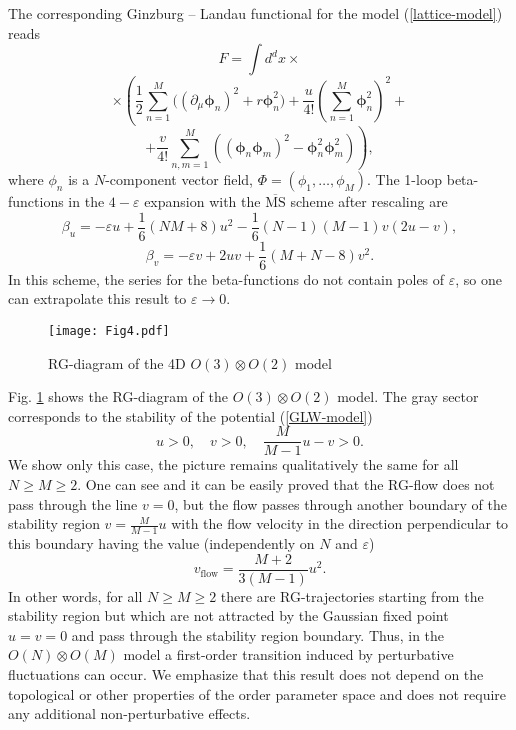\documentclass[final,twocolumn]{elsarticle}
\begin{document}
The corresponding Ginzburg -- Landau functional for the model (\ref{lattice-model}) reads \cite{Kawamura90}
$$
    F=\int d^dx\times
$$
$$
    \times\left(\frac12\sum_{n=1}^{M}\bigl((\partial_\mu\mathbf{\phi}_n)^2+r\mathbf{\phi}_n^2\bigr)+
    \frac u{4!}\left(\sum_{n=1}^M\mathbf{\phi}_n^2\right)^2+\right.
$$
\begin{equation}
    \left.
    +\frac v{4!}\sum_{n,m=1}^M\left((\mathbf{\phi}_n\mathbf{\phi}_m)^2-\mathbf{\phi}_n^2\mathbf{\phi}_m^2\right)\right),
    \label{GLW-model}
\end{equation}
where $\phi_n$ is a $N$-component vector field, $\Phi=(\phi_1,\ldots,\phi_M)$. The 1-loop beta-functions in the $4-\varepsilon$ expansion with the $\overline{\mathrm{MS}}$ scheme after rescaling are
\begin{equation}
    \beta_u=-\varepsilon u+\frac16(NM+8)u^2-\frac16(N-1)(M-1)v(2u-v),
\end{equation}
\begin{equation}
    \beta_v=-\varepsilon v+2uv+\frac16(M+N-8)v^2.
\end{equation}
In this scheme, the series for the beta-functions do not contain poles of $\varepsilon$, so one can extrapolate this result to $\varepsilon\to0$.

\begin{figure}[t]
    \center
    \texttt{[image: Fig4.pdf]}%
    \caption{\label{fig4} RG-diagram of the 4D $O(3)\otimes O(2)$ model}
\end{figure}%
Fig. \ref{fig4} shows the RG-diagram of the $O(3)\otimes O(2)$ model. The gray sector corresponds to the stability of the potential (\ref{GLW-model})
\begin{equation}
    u>0,\quad v>0,\quad \frac{M}{M-1}u-v>0.
\end{equation}
We show only this case, the picture remains qualitatively the same for all $N\geq M\geq2$. One can see and it can be easily proved that the RG-flow does not pass through the line $v=0$, but the flow passes through another boundary of the stability region $v=\frac{M}{M-1}u$ with the flow velocity in the direction perpendicular to this boundary having the value (independently on $N$ and $\varepsilon$)
\begin{equation}
    v_{\mathrm{flow}}=\frac{M+2}{3(M-1)}u^2.
\end{equation}
In other words, for all $N\geq M\geq2$ there are RG-trajectories starting from the stability region but which are not attracted by the Gaussian fixed point $u=v=0$ and pass through the stability region boundary. Thus, in the $O(N)\otimes O(M)$ model a first-order transition induced by perturbative fluctuations can occur. We emphasize that this result does not depend on the topological or other properties of the order parameter space and does not require any additional non-perturbative effects.
\end{document}
